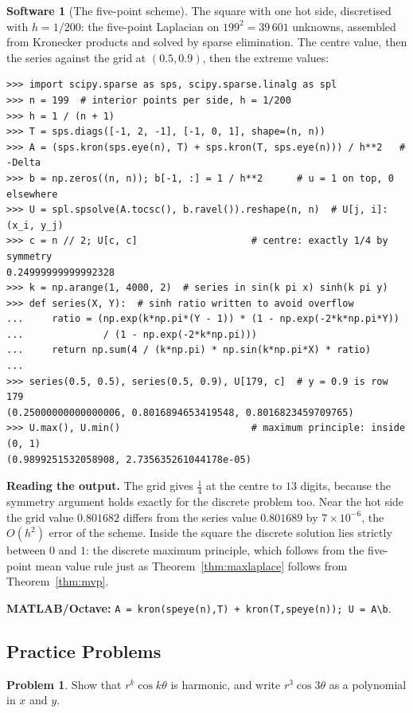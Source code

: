 \documentclass[11pt,a4paper]{article}
\numberwithin{equation}{section}
\theoremstyle{definition}
\newtheorem{software}[thm]{Software}
\newtheorem{problemx}{Problem}[subsection]
\newenvironment{problem}{\begin{problemx}}{\end{problemx}}
\begin{document}
\begin{software}[The five-point scheme]
\label{sw:fivepoint}
The square with one hot side, discretised with $h = 1/200$: the five-point Laplacian on $199^2 = 39\,601$ unknowns, assembled from Kronecker products and solved by sparse elimination. The centre value, then the series against the grid at $(0.5, 0.9)$, then the extreme values:
{\small\begin{verbatim}
>>> import scipy.sparse as sps, scipy.sparse.linalg as spl
>>> n = 199  # interior points per side, h = 1/200
>>> h = 1 / (n + 1)
>>> T = sps.diags([-1, 2, -1], [-1, 0, 1], shape=(n, n))
>>> A = (sps.kron(sps.eye(n), T) + sps.kron(T, sps.eye(n))) / h**2   # -Delta
>>> b = np.zeros((n, n)); b[-1, :] = 1 / h**2      # u = 1 on top, 0 elsewhere
>>> U = spl.spsolve(A.tocsc(), b.ravel()).reshape(n, n)  # U[j, i]: (x_i, y_j)
>>> c = n // 2; U[c, c]                    # centre: exactly 1/4 by symmetry
0.24999999999992328
>>> k = np.arange(1, 4000, 2)  # series in sin(k pi x) sinh(k pi y)
>>> def series(X, Y):  # sinh ratio written to avoid overflow
...     ratio = (np.exp(k*np.pi*(Y - 1)) * (1 - np.exp(-2*k*np.pi*Y))
...              / (1 - np.exp(-2*k*np.pi)))
...     return np.sum(4 / (k*np.pi) * np.sin(k*np.pi*X) * ratio)
...
>>> series(0.5, 0.5), series(0.5, 0.9), U[179, c]  # y = 0.9 is row 179
(0.25000000000000006, 0.8016894653419548, 0.8016823459709765)
>>> U.max(), U.min()                       # maximum principle: inside (0, 1)
(0.9899251532058908, 2.735635261044178e-05)
\end{verbatim}}
\textbf{Reading the output.} The grid gives $\frac14$ at the centre to $13$ digits, because the symmetry argument holds exactly for the discrete problem too. Near the hot side the grid value $0.801682$ differs from the series value $0.801689$ by $7 \times 10^{-6}$, the $O(h^2)$ error of the scheme. Inside the square the
discrete solution lies strictly between $0$ and $1$: the discrete maximum principle, which follows from the five-point mean value rule just as Theorem~\ref{thm:maxlaplace} follows from Theorem~\ref{thm:mvp}.

\textbf{MATLAB/Octave:} \texttt{A = kron(speye(n),T) + kron(T,speye(n)); U = A\textbackslash b}.
\end{software}

\subsection{Practice Problems}

\begin{problem}
Show that $r^k\cos k\theta$ is harmonic, and write $r^3\cos 3\theta$ as a polynomial in $x$ and $y$.
\end{problem}
\end{document}
